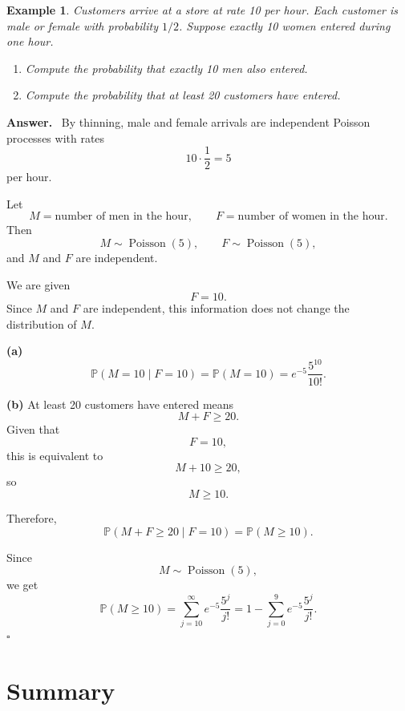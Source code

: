 \documentclass[12pt,a4paper]{article}
\theoremstyle{lecturestyle}
\newtheorem{example}{Example}
\newenvironment{answer}
{\par\textbf{Answer.}\ }
{\hfill$\square$\par}
\newcommand{\Prob}{\mathbb{P}}
\begin{document}
\begin{example}
Customers arrive at a store at rate 10 per hour. Each customer is male or female with probability $1/2$. Suppose exactly 10 women entered during one hour.

\begin{enumerate}[label=(\alph*)]
    \item Compute the probability that exactly 10 men also entered.
    \item Compute the probability that at least 20 customers have entered.
\end{enumerate}
\end{example}

\begin{answer}
By thinning, male and female arrivals are independent Poisson processes with rates
\[
10\cdot\frac12=5
\]
per hour.

Let
\[
M=\text{number of men in the hour},
\qquad
F=\text{number of women in the hour}.
\]
Then
\[
M\sim \operatorname{Poisson}(5),
\qquad
F\sim \operatorname{Poisson}(5),
\]
and $M$ and $F$ are independent.

We are given
\[
F=10.
\]
Since $M$ and $F$ are independent, this information does not change the distribution of $M$.

\textbf{(a)}
\[
\Prob(M=10\mid F=10)=\Prob(M=10)
=
e^{-5}\frac{5^{10}}{10!}.
\]

\textbf{(b)} At least 20 customers have entered means
\[
M+F\geq20.
\]
Given that
\[
F=10,
\]
this is equivalent to
\[
M+10\geq20,
\]
so
\[
M\geq10.
\]

Therefore,
\[
\Prob(M+F\geq20\mid F=10)
=
\Prob(M\geq10).
\]

Since
\[
M\sim \operatorname{Poisson}(5),
\]
we get
\[
\Prob(M\geq10)
=
\sum_{j=10}^{\infty}e^{-5}\frac{5^j}{j!}
=
1-\sum_{j=0}^{9}e^{-5}\frac{5^j}{j!}.
\]
\end{answer}

\section{Summary}
\end{document}
